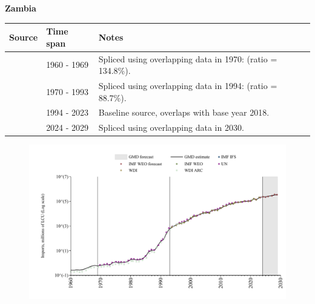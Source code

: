 \documentclass[12pt,a4paper,landscape]{article}
\begin{document}
\begin{adjustbox}{max totalsize={\paperwidth}{\paperheight},center}
\begin{minipage}[t][\textheight][t]{\textwidth}
\vspace*{0.5cm}
{}
\begin{center}
{\Large\bfseries Zambia}
\end{center}
\vspace{0.5cm}
\begin{table}[H]
\centering
\small
\begin{tabular}{|l|l|l|}
\hline
\textbf{Source} & \textbf{Time span} & \textbf{Notes} \\
\hline
\rowcolor{white}\cite{WDI_ARC}& 1960 - 1969 &Spliced using overlapping data in 1970: (ratio = 134.8\%).\\
\rowcolor{lightgray}\cite{UN}& 1970 - 1993 &Spliced using overlapping data in 1994: (ratio = 88.7\%).\\
\rowcolor{white}\cite{WDI}& 1994 - 2023 &Baseline source, overlaps with base year 2018.\\
\rowcolor{lightgray}\cite{IMF_WEO_forecast}& 2024 - 2029 &Spliced using overlapping data in 2030.\\
\hline
\end{tabular}
\end{table}
\begin{figure}[H]
\centering
\includegraphics[width=\textwidth,height=0.6\textheight,keepaspectratio]{graphs/ZMB_imports.pdf}
\end{figure}
\end{minipage}
\end{adjustbox}
\end{document}
